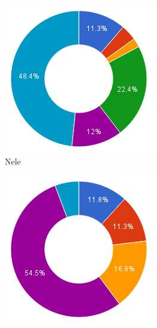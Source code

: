 \documentclass[t1]{penoverslag}
\begin{document}
\begin{figure}
        \centering
        \begin{subfigure}[hb]{0.15\textwidth}
                \centering
                \includegraphics[width=\textwidth]{werk_Nele}
                \caption{Nele}
        \end{subfigure}%
        \begin{subfigure}[hb]{0.15\textwidth}
                \centering
                \includegraphics[width=\textwidth]{werk_Toon}

\end{subfigure}
\end{figure}
\end{document}
